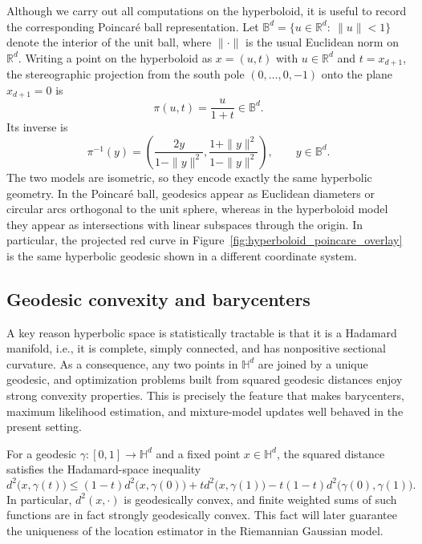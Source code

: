 \documentclass[11pt]{article}
\begin{document}
Although we carry out all computations on the hyperboloid, it is useful to record the corresponding Poincar\'e ball representation. Let $\mathbb{B}^d=\{u\in\mathbb{R}^d:\ \|u\|<1\}$ denote the interior of the unit ball, 
where \(\|\cdot\|\) is the usual Euclidean norm on \(\mathbb{R}^d\). Writing a point on the hyperboloid as \(x=(u,t)\) with \(u\in\mathbb{R}^d\) and \(t=x_{d+1}\), the stereographic projection from the south pole \((0,\ldots,0,-1)\) onto the plane \(x_{d+1}=0\) is
\begin{equation}\label{eq:bg_stereographic}
\pi(u,t)=\frac{u}{1+t}\in\mathbb{B}^d.
\end{equation}
Its inverse is
\begin{equation}\label{eq:bg_stereographic_inverse}
\pi^{-1}(y)
=
\left(
\frac{2y}{1-\|y\|^2},
\frac{1+\|y\|^2}{1-\|y\|^2}
\right),
\qquad y\in\mathbb{B}^d.
\end{equation}
The two models are isometric, so they encode exactly the same hyperbolic geometry. In the Poincar\'e ball, geodesics appear as Euclidean diameters or circular arcs orthogonal to the unit sphere, whereas in the hyperboloid model they appear as intersections with linear subspaces through the origin. In particular, the projected red curve in Figure~\ref{fig:hyperboloid_poincare_overlay} is the same hyperbolic geodesic shown in a different coordinate system.

\subsection{Geodesic convexity and barycenters}\label{subsec:background_barycenter}


A key reason hyperbolic space is statistically tractable is that it is a Hadamard manifold, i.e., it is complete, simply connected, and has nonpositive sectional curvature. As a consequence, any two points in \(\mathbb{H}^d\) are joined by a unique geodesic, and optimization problems built from squared geodesic distances enjoy strong convexity properties. This is precisely the feature that makes barycenters, maximum likelihood estimation, and mixture-model updates well behaved in the present setting.

For a geodesic \(\gamma:[0,1]\to\mathbb{H}^d\) and a fixed point \(x\in\mathbb{H}^d\), the squared distance satisfies the Hadamard-space inequality
\begin{equation}\label{eq:bg_strong_convexity}
d^2\!\bigl(x,\gamma(t)\bigr)
\le
(1-t)d^2\!\bigl(x,\gamma(0)\bigr)
+
td^2\!\bigl(x,\gamma(1)\bigr)
-
t(1-t)d^2\!\bigl(\gamma(0),\gamma(1)\bigr).
\end{equation}
In particular, \(d^2(x,\cdot)\) is geodesically convex, and finite weighted sums of such functions are in fact strongly geodesically convex. This fact will later guarantee the uniqueness of the location estimator in the Riemannian Gaussian model.
\end{document}
